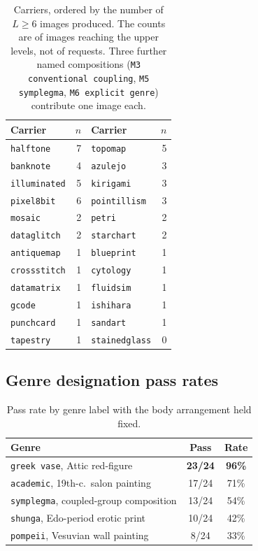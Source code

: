 \begin{table}[H]
\centering\small
\begin{tabular}{@{}lrlr@{}}
\toprule
Carrier & $n$ & Carrier & $n$ \\
\midrule
\texttt{halftone}   & 7 & \texttt{topomap}      & 5 \\
\texttt{banknote}   & 4 & \texttt{azulejo}      & 3 \\
\texttt{illuminated}& 5 & \texttt{kirigami}     & 3 \\
\texttt{pixel8bit}  & 6 & \texttt{pointillism}  & 3 \\
\texttt{mosaic}     & 2 & \texttt{petri}        & 2 \\
\texttt{dataglitch} & 2 & \texttt{starchart}    & 2 \\
\texttt{antiquemap} & 1 & \texttt{blueprint}    & 1 \\
\texttt{crossstitch}& 1 & \texttt{cytology}     & 1 \\
\texttt{datamatrix} & 1 & \texttt{fluidsim}     & 1 \\
\texttt{gcode}      & 1 & \texttt{ishihara}     & 1 \\
\texttt{punchcard}  & 1 & \texttt{sandart}      & 1 \\
\texttt{tapestry}   & 1 & \texttt{stainedglass} & 0 \\
\bottomrule
\end{tabular}
\caption{Carriers, ordered by the number of $L\ge6$ images produced. The
counts are of images reaching the upper levels, not of requests. Three further
named compositions (\texttt{M3 conventional coupling}, \texttt{M5 symplegma},
\texttt{M6 explicit genre}) contribute one image each.}
\label{tab:carrier}
\end{table}

\subsection{Genre designation pass rates}

\begin{table}[H]
\centering\small
\begin{tabularx}{\linewidth}{@{}Xcc@{}}
\toprule
Genre & Pass & Rate \\
\midrule
\texttt{greek vase}, Attic red-figure & \textbf{23/24} & \textbf{96\%} \\
\texttt{academic}, 19th-c.\ salon painting & 17/24 & 71\% \\
\texttt{symplegma}, coupled-group composition & 13/24 & 54\% \\
\texttt{shunga}, Edo-period erotic print & 10/24 & 42\% \\
\texttt{pompeii}, Vesuvian wall painting & 8/24 & 33\% \\
\bottomrule
\end{tabularx}
\caption{Pass rate by genre label with the body arrangement held fixed.}
\label{tab:genre}
\end{table}

